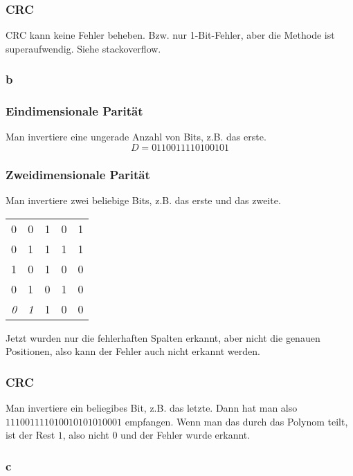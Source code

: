 \documentclass[10pt,a4paper]{article}
\begin{document}
\subsubsection{CRC}

CRC kann keine Fehler beheben. Bzw. nur 1-Bit-Fehler, aber die Methode ist superaufwendig. Siehe stackoverflow.

\subsubsection{b}

\subsubsection{Eindimensionale Parität}

Man invertiere eine ungerade Anzahl von Bits, z.B. das erste.
\begin{equation}
  D = 0110011110100101
\end{equation}

\subsubsection{Zweidimensionale Parität}

Man invertiere zwei beliebige Bits, z.B. das erste und das zweite.
\\
\begin{tabular}{cccc|c}
  0 & 0 & 1 & 0 & 1\\
  0 & 1 & 1 & 1 & 1\\
  1 & 0 & 1 & 0 & 0\\
  0 & 1 & 0 & 1 & 0\\\hline
  \textit{0} & \textit{1} & 1 & 0 & 0
\end{tabular}
Jetzt wurden nur die fehlerhaften Spalten erkannt, aber nicht die genauen
Positionen, also kann der Fehler auch nicht erkannt werden.

\subsubsection{CRC}

Man invertiere ein beliegibes Bit, z.B. das letzte. Dann hat man also
$111001111010010101010001$ empfangen. Wenn man das durch das Polynom teilt, ist
der Rest $1$, also nicht $0$ und der Fehler wurde erkannt.

\subsubsection{c}
\end{document}
